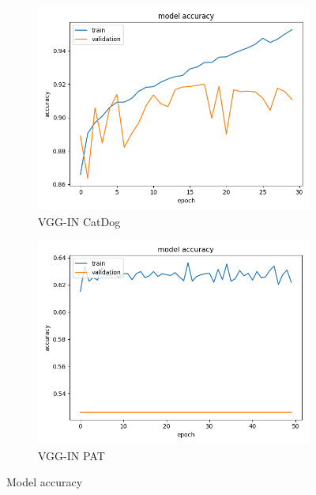 \begin{figure}
\begin{subfigure}[b]{.45\linewidth}
\includegraphics[width=\linewidth]{Figs/vgg_in_catdog_acc.jpg}
\caption{VGG-IN CatDog}
\end{subfigure}
\begin{subfigure}[b]{.45\linewidth}
\includegraphics[width=\linewidth]{Figs/vgg_pat_acc.jpg}
\caption{VGG-IN PAT}
\end{subfigure}
\caption{Model accuracy}
\label{fig:acc2}
\end{figure}

